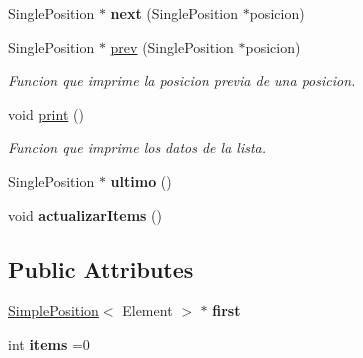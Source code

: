 \begin{DoxyCompactItemize}
\item 
\mbox{\label{class_single_linked_list_ab331e696e15ff692e981013551982729}} 
Single\+Position $\ast$ {\bfseries next} (Single\+Position $\ast$posicion)
\item 
\mbox{\label{class_single_linked_list_a7d218797f7c7cb3a341c2093db50ee17}} 
Single\+Position $\ast$ \hyperlink{class_single_linked_list_a7d218797f7c7cb3a341c2093db50ee17}{prev} (Single\+Position $\ast$posicion)
\begin{DoxyCompactList}\small\item\em Funcion que imprime la posicion previa de una posicion. \end{DoxyCompactList}\item 
\mbox{\label{class_single_linked_list_a64d9f3e1bad3eec787d2bcc7255c1311}} 
void \hyperlink{class_single_linked_list_a64d9f3e1bad3eec787d2bcc7255c1311}{print} ()
\begin{DoxyCompactList}\small\item\em Funcion que imprime los datos de la lista. \end{DoxyCompactList}\item 
\mbox{\label{class_single_linked_list_a25ee349bf911508a148f6f19485852ee}} 
Single\+Position $\ast$ {\bfseries ultimo} ()
\item 
\mbox{\label{class_single_linked_list_acd86bee36a54701cbf4bdf146d857cf0}} 
void {\bfseries actualizar\+Items} ()
\end{DoxyCompactItemize}
\subsection*{Public Attributes}
\begin{DoxyCompactItemize}
\item 
\mbox{\label{class_single_linked_list_a1bba63179853755794f7f578265b3e60}} 
\hyperlink{class_simple_position}{Simple\+Position}$<$ Element $>$ $\ast$ {\bfseries first}
\item 
\mbox{\label{class_single_linked_list_a8449fa747af940f9d1c9c6e8758539b8}} 
int {\bfseries items} =0
\end{DoxyCompactItemize}


